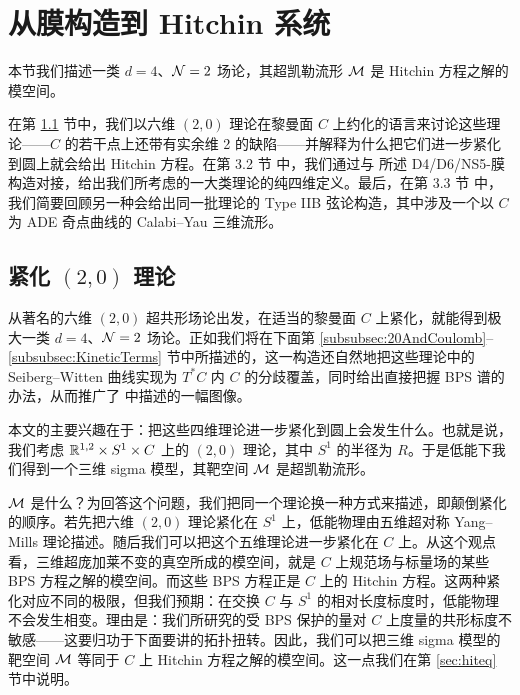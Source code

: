 
\section{从膜构造到 Hitchin 系统} \label{sec:physics}

本节我们描述一类 $d=4$、$\mathcal{N}=2$ 场论，其超凯勒流形 $\mathcal{M}$ 是 Hitchin 方程之解的模空间。

在第 \ref{sec:scft} 节中，我们以六维 $(2,0)$ 理论在黎曼面 $C$ 上约化的语言来讨论这些理论——$C$ 的若干点上还带有实余维 2 的缺陷——并解释为什么把它们进一步紧化到圆上就会给出 Hitchin 方程。在第 3.2 节%
中，我们通过与 \cite{Witten:1997sc} 所述 D4/D6/NS5-膜构造对接，给出我们所考虑的一大类理论的纯四维定义。最后，在第 3.3 节%
中，我们简要回顾另一种会给出同一批理论的 Type IIB 弦论构造，其中涉及一个以 $C$ 为 ADE 奇点曲线的 Calabi–Yau 三维流形。

\subsection{紧化 $(2,0)$ 理论} \label{sec:scft}

从著名的六维 $(2,0)$ 超共形场论出发，在适当的黎曼面 $C$ 上紧化，就能得到极大一类 $d=4$、$\mathcal{N}=2$ 场论。正如我们将在下面第 \ref{subsubsec:20AndCoulomb}–\ref{subsubsec:KineticTerms} 节中所描述的，这一构造还自然地把这些理论中的 Seiberg–Witten 曲线实现为 $T^*C$ 内 $C$ 的分歧覆盖，同时给出直接把握 BPS 谱的办法，从而推广了 \cite{Klemm:1996bj} 中描述的一幅图像。

本文的主要兴趣在于：把这些四维理论进一步紧化到圆上会发生什么。也就是说，我们考虑 $\mathbb{R}^{1,2} \times S^1 \times C$ 上的 $(2,0)$ 理论，其中 $S^1$ 的半径为 $R$。于是低能下我们得到一个三维 sigma 模型，其靶空间 $\mathcal{M}$ 是超凯勒流形。

$\mathcal{M}$ 是什么？为回答这个问题，我们把同一个理论换一种方式来描述，即颠倒紧化的顺序。若先把六维 $(2,0)$ 理论紧化在 $S^1$ 上，低能物理由五维超对称 Yang–Mills 理论描述。随后我们可以把这个五维理论进一步紧化在 $C$ 上。从这个观点看，三维超庞加莱不变的真空所成的模空间，就是 $C$ 上规范场与标量场的某些 BPS 方程之解的模空间。而这些 BPS 方程正是 $C$ 上的 Hitchin 方程。这两种紧化对应不同的极限，但我们预期：在交换 $C$ 与 $S^1$ 的相对长度标度时，低能物理不会发生相变。理由是：我们所研究的受 BPS 保护的量对 $C$ 上度量的共形标度不敏感——这要归功于下面要讲的拓扑扭转。因此，我们可以把三维 sigma 模型的靶空间 $\mathcal{M}$ 等同于 $C$ 上 Hitchin 方程之解的模空间。这一点我们在第 \ref{sec:hiteq} 节中说明。

